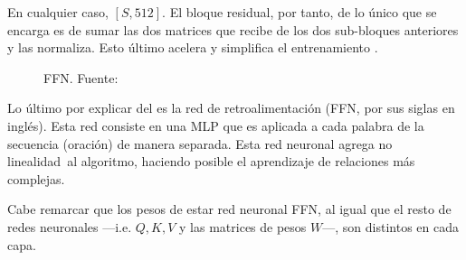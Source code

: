 En cualquier caso,  $[S,512]$. El bloque residual, por tanto, de lo único que se encarga es de sumar las dos matrices que recibe de los dos sub-bloques anteriores y las normaliza. Esto último acelera y simplifica el entrenamiento \parencite{batchNormalization}.


\begin{figure}[H]
    \centering
    \caption{F\hspace{1pt}F\hspace{1pt}N. \scriptsize{Fuente: \parencite{transformers}}}
    \label{FFN}
\end{figure}

Lo último por explicar del  es la red de retroalimentación (FFN, por sus siglas en inglés). Esta red consiste en una MLP que es aplicada a cada palabra de la secuencia (oración) de manera separada. Esta red neuronal agrega no linealidad\fnm\ al algoritmo, haciendo posible el aprendizaje de relaciones más complejas.

Cabe remarcar que los pesos de estar red neuronal FFN, al igual que el resto de redes neuronales ---i.e. $Q, K, V$ y las matrices de pesos $W$---, son distintos en cada capa.

